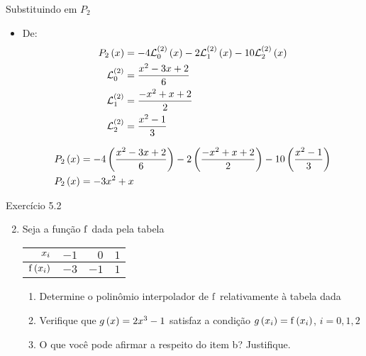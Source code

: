 \begin{frame}{Substituindo em $P_2$}
\begin{itemize}
  \item De: 
\begin{align*}
P_2\left(x\right) &= -4 \mathcal{L}_{0}^{\left(2\right)} \left(x\right) -2 \mathcal{L}_{1}^{\left(2\right)} \left(x\right) -10 \mathcal{L}_{2}^{\left(2\right)} \left(x\right)\\
\mathcal{L}_{0}^{\left(2\right)} &= \frac{x^2 - 3 x + 2}{6}\\
\mathcal{L}_{1}^{\left(2\right)} &= \frac{-x^2 + x +2}{2}\\
\mathcal{L}_{2}^{\left(2\right)} &= \frac{x^2 -1}{3}
\end{align*}

\begin{align*}
P_2\left(x\right) &= -4 \left(\frac{x^2 - 3 x + 2}{6}\right)  -2 \left(\frac{-x^2 + x +2}{2}\right) -10 \left(\frac{x^2 -1}{3}\right)\\
P_2\left(x\right) &= -3 x^2 + x
\end{align*}

\end{itemize}

\end{frame}

\begin{frame}{Exercício 5.2}
\begin{enumerate}
\setcounter{enumi}{1}
  \item Seja a função $\mathrm{f}$ dada pela tabela\\
\begin{tabular}{r|rrr}
$x_i$ & \hspace{0.3cm} $-1$ & \hspace{0.3cm} $0$ & \hspace{0.3cm} $1$\\
\hline
$\mathrm{f} \left(x_i\right)$ & $-3$ & $-1$ & $1$ 
\end{tabular}
  \begin{enumerate}
    \item\label{item:exe52-1} Determine  o polinômio interpolador de $\mathrm{f}$ relativamente à tabela dada
    \item\label{item:exe52-2} Verifique que $g \left(x\right) = 2 x^3 -1$ satisfaz a condição $g\left(x_i\right) = \mathrm{f} \left(x_i\right)$, $i = 0, 1, 2$
    \item\label{item:exe52-3} O que você pode afirmar a respeito do item b? Justifique.
  \end{enumerate}
\end{enumerate}
\end{frame}

